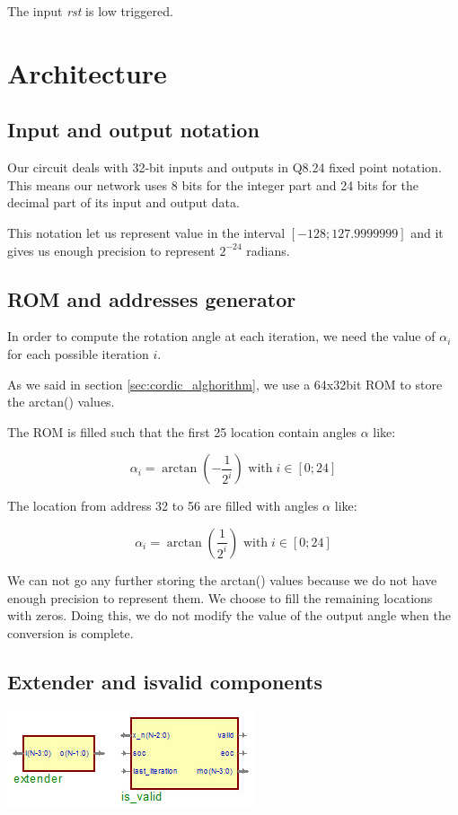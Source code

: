 \documentclass[12pt,a4paper]{report}
\begin{document}
The input \emph{rst} is low triggered.


\chapter{Architecture}

\section{Input and output notation}
Our circuit deals with 32-bit inputs and outputs in Q8.24 fixed point notation. This means our network uses 8 bits for the integer part and 24 bits for the decimal part of its input and output data.

This notation let us represent value in the interval $ \left[ -128; 127.9999999 \right]$ and it gives us enough precision to represent $2^{-24}$ radians.

\section{ROM and addresses generator}
In order to compute the rotation angle at each iteration, we need the value of $\alpha_{i}$ for each possible iteration $i$.

As we said in section \ref{sec:cordic_alghorithm}, we use a 64x32bit ROM to store the arctan() values.

The ROM is filled such that the first 25 location contain angles $\alpha$ like:

\begin{equation}
\alpha_{i} = \arctan \left( - \dfrac{1}{2^{i}} \right) \mbox{ with} \; i \in \left[0; 24 \right]
\end{equation}

The location from address 32 to 56 are filled with angles $\alpha$ like:

\begin{equation}
\alpha_{i} = \arctan \left(\dfrac{1}{2^{i}} \right) \mbox{ with} \; i \in \left[0; 24 \right]
\end{equation}

We can not go any further storing the arctan() values because we do not have enough precision to represent them. We choose to fill the remaining locations with zeros. Doing this, we do not modify the value of the output angle when the conversion is complete.

\section{Extender and is\textunderscore valid components}
\begin{center}
\includegraphics{img/isvalid.jpg}
\end{center}
\end{document}
